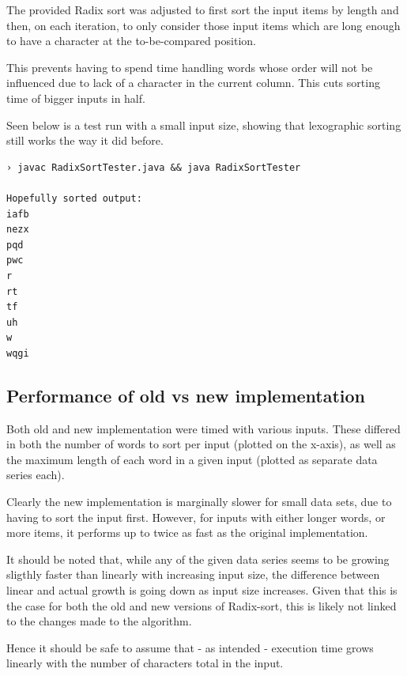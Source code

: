 \documentclass[a4paper]{scrartcl}
\begin{document}
The provided Radix sort was adjusted to first sort the input items by length
and then, on each iteration, to only consider those input items which are long
enough to have a character at the to-be-compared position.

This prevents having to spend time handling words whose order will not be
influenced due to lack of a character in the current column. This cuts sorting
time of bigger inputs in half.

Seen below is a test run with a small input size, showing that lexographic
sorting still works the way it did before.

\begin{verbatim}
› javac RadixSortTester.java && java RadixSortTester
  
Hopefully sorted output:
iafb
nezx
pqd
pwc
r
rt
tf
uh
w
wqgi
\end{verbatim}

\subsection{Performance of old vs new implementation}
\FloatBarrier

Both old and new implementation were timed with various inputs. These differed
in both the number of words to sort per input (plotted on the x-axis), as well
as the maximum length of each word in a given input (plotted as separate data
series each).

Clearly the new implementation is marginally slower for small data sets, due to
having to sort the input first. However, for inputs with either longer words,
or more items, it performs up to twice as fast as the original implementation.

It should be noted that, while any of the given data series seems to be growing
sligthly faster than linearly with increasing input size, the difference
between linear and actual growth is going down as input size increases. Given
that this is the case for both the old and new versions of Radix-sort, this is
likely not linked to the changes made to the algorithm.

Hence it should be safe to assume that - as intended - execution time grows
linearly with the number of characters total in the input.
\end{document}
